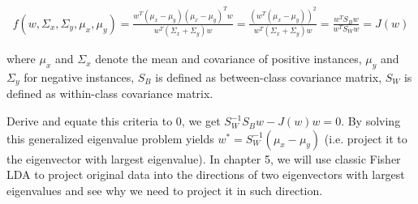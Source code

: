 \documentclass{article} %
\begin{document}
\begin{equation}
\begin{split}
f(w,\Sigma_x,\Sigma_y,\mu_x,\mu_y)=\frac{w^T(\mu_x - \mu_y)(\mu_x - \mu_y)^Tw}{w^T(\Sigma_x + \Sigma_y)w}=\frac{(w^T(\mu_x - \mu_y))^2}{w^T(\Sigma_x + \Sigma_y)w} = \frac{w^TS_Bw}{w^TS_Ww}=J(w)
\end{split}
\label{fisher}
\end{equation}

where $\mu_x$ and $\Sigma_x$ denote the mean and covariance of positive instances, $\mu_y$ and $\Sigma_y$ for negative instances, $S_B$ is defined as between-class covariance matrix, $S_W$ is defined as within-class covariance matrix.

Derive and equate this criteria to 0, we get $S_W^{-1}S_Bw-J(w)w=0$. By solving this generalized eigenvalue problem yields $w^*=S_W^{-1}(\mu_x - \mu_y)$ (i.e. project it to the eigenvector with largest eigenvalue). In chapter 5, we will use classic Fisher LDA to project original data into the directions of two eigenvectors with largest eigenvalues and see why we need to project it in such direction.








\end{document}

